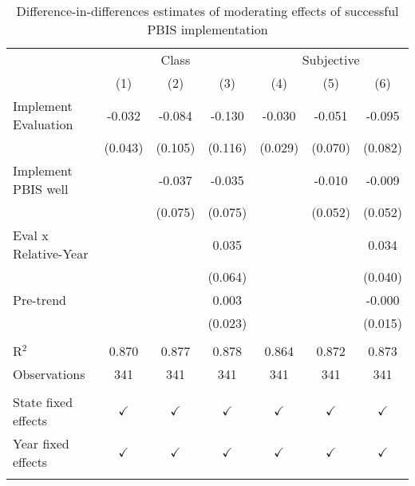 
\begin{table}[!htbp]
   \centering
   \caption{\label{tab:pbis} Difference-in-differences estimates of moderating effects of successful PBIS implementation}
   \begin{tabular}{lcccccc}
      \toprule
       & \multicolumn{3}{c}{Class} & \multicolumn{3}{c}{Subjective}\\
                           & (1)           & (2)           & (3)           & (4)           & (5)           & (6)\\
      \midrule 
      Implement Evaluation & -0.032        & -0.084        & -0.130        & -0.030        & -0.051        & -0.095\\
                           & (0.043)       & (0.105)       & (0.116)       & (0.029)       & (0.070)       & (0.082)\\
      Implement PBIS well  &               & -0.037        & -0.035        &               & -0.010        & -0.009\\
                           &               & (0.075)       & (0.075)       &               & (0.052)       & (0.052)\\
      Eval x Relative-Year &               &               & 0.035         &               &               & 0.034\\
                           &               &               & (0.064)       &               &               & (0.040)\\
      Pre-trend            &               &               & 0.003         &               &               & -0.000\\
                           &               &               & (0.023)       &               &               & (0.015)\\
  \hline \\[-1.8ex]
      R$^2$                & 0.870         & 0.877         & 0.878         & 0.864         & 0.872         & 0.873\\
      Observations         & 341           & 341           & 341           & 341           & 341           & 341\\
 \hline \\[-1.8ex]
      State fixed effects  & $\checkmark$ & $\checkmark$ & $\checkmark$ & $\checkmark$ & $\checkmark$ & $\checkmark$\\
      Year fixed effects   & $\checkmark$ & $\checkmark$ & $\checkmark$ & $\checkmark$ & $\checkmark$ & $\checkmark$\\
 \bottomrule  \\[-1.8ex]


\end{tabular}
\end{table}
